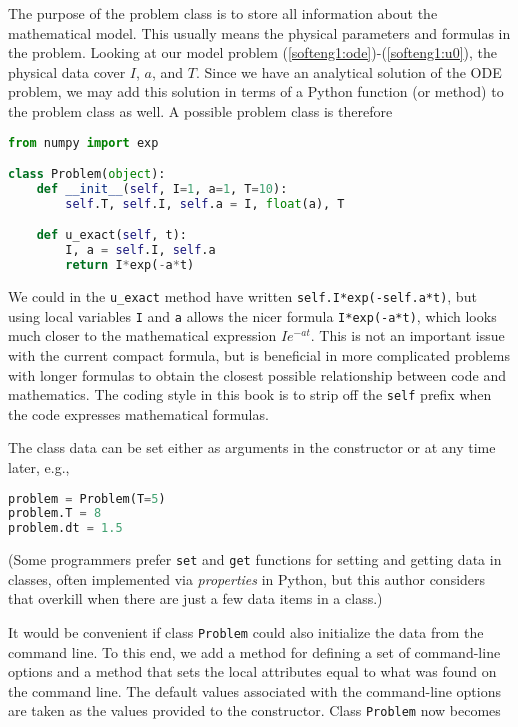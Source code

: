 \documentclass[graybox,sectrefs,envcountresetchap,open=right,final]{svmonodo}
\begin{document}

The purpose of the problem class is to store all information about
the mathematical model. This usually means the physical parameters
and formulas
in the problem. Looking at our model problem
(\ref{softeng1:ode})-(\ref{softeng1:u0}), the physical data cover
$I$, $a$, and $T$. Since we have an analytical solution of
the ODE problem, we may add this solution in terms of a Python
function (or method) to the problem class as well.
A possible problem class is therefore

\begin{lstlisting}[language=Python,style=blue1_bluegreen]
from numpy import exp

class Problem(object):
    def __init__(self, I=1, a=1, T=10):
        self.T, self.I, self.a = I, float(a), T

    def u_exact(self, t):
        I, a = self.I, self.a
        return I*exp(-a*t)
\end{lstlisting}
We could in the \Verb!u_exact! method have written
\texttt{self.I*exp(-self.a*t)}, but using local variables \texttt{I} and \texttt{a} allows
the nicer formula \texttt{I*exp(-a*t)}, which looks much closer to the mathematical
expression $Ie^{-at}$.  This is not an important issue with the
current compact formula, but is beneficial in more complicated
problems with longer formulas to obtain the closest possible
relationship between code and mathematics. The coding style in
this book is to strip
off the \texttt{self} prefix when the code expresses mathematical formulas.

The class data can be set either as arguments in the constructor or
at any time later, e.g.,

\begin{lstlisting}[language=Python,style=blue1_bluegreen]
problem = Problem(T=5)
problem.T = 8
problem.dt = 1.5
\end{lstlisting}
(Some programmers prefer \texttt{set} and \texttt{get} functions for setting and getting
data in classes, often implemented via \emph{properties} in Python, but
this author considers that overkill when there are just a few data items
in a class.)

It would be convenient if class \texttt{Problem} could also initialize
the data from the command line. To this end, we add a method for
defining a set of command-line options and a method that sets the
local attributes equal to what was found on the command line.
The default values associated with the command-line options are taken
as the values provided to the constructor. Class \texttt{Problem} now becomes
\end{document}
